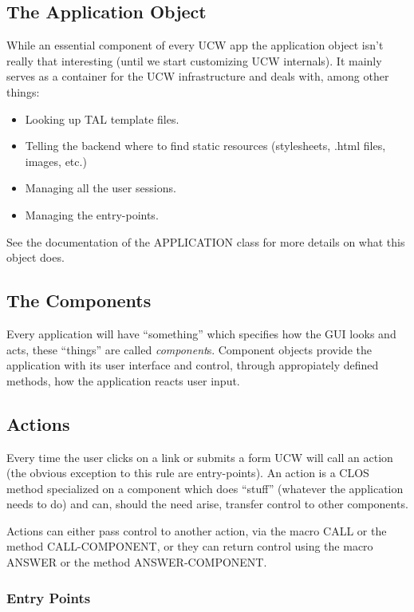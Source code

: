 \documentclass[a4paper]{article}
\newcommand{\ucw}{\textsc{UCW}}
\newcommand{\sym}[1]{\textsc{#1}}
\begin{document}
\subsection{The Application Object}

While an essential component of every \ucw{} app the application
object isn't really that interesting (until we start customizing
\ucw{} internals). It mainly serves as a container for the \ucw{}
infrastructure and deals with, among other things:

\begin{itemize}
\item Looking up TAL template files.
\item Telling the backend where to find static resources (stylesheets,
  .html files, images, etc.)
\item Managing all the user sessions.
\item Managing the entry-points.
\end{itemize}

See the documentation of the \sym{APPLICATION} class for more details
on what this object does.

\subsection{The Components}

Every application will have ``something'' which specifies how the GUI
looks and acts, these ``things'' are called
\textit{component}s. Component objects provide the application with
its user interface and control, through appropiately defined methods,
how the application reacts user input.

\subsection{Actions}

Every time the user clicks on a link or submits a form \ucw{} will
call an action (the obvious exception to this rule are
entry-points). An action is a CLOS method specialized on a component
which does ``stuff'' (whatever the application needs to do) and can,
should the need arise, transfer control to other components.

Actions can either pass control to another action, via the macro
\sym{CALL} or the method \sym{CALL-COMPONENT}, or they can return
control using the macro \sym{ANSWER} or the method
\sym{ANSWER-COMPONENT}.

\subsubsection{Entry Points}
\end{document}

